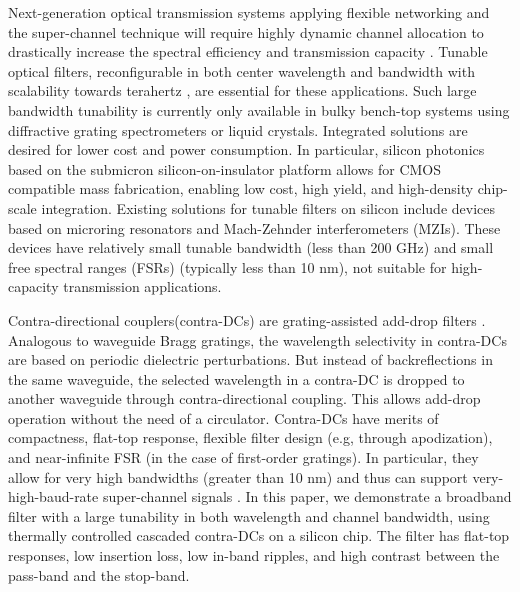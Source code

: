 \documentclass[osajnl,twocolumn,showpacs,superscriptaddress,10pt]{revtex4-1}
\begin{document}
Next-generation optical transmission systems applying flexible networking and the super-channel technique will require highly dynamic channel allocation to drastically increase the spectral efficiency and transmission capacity \cite{jinno2009spectrum, geisler2011demonstration}.
Tunable optical filters, reconfigurable in both center wavelength and bandwidth with scalability towards terahertz \cite{geisler2011demonstration}, are essential for these applications.
Such large bandwidth tunability is currently only available in bulky bench-top systems using diffractive grating spectrometers or liquid crystals.
Integrated solutions are desired for lower cost and power consumption.
In particular, silicon photonics  based on the submicron silicon-on-insulator platform allows for CMOS compatible mass fabrication, enabling low cost, high yield, and high-density chip-scale integration.
Existing solutions for tunable  filters on silicon include devices based on microring resonators \cite{DynamicBW, ong2013ultra} and Mach-Zehnder interferometers (MZIs). These devices have relatively small tunable bandwidth (less than 200 GHz) and small free spectral ranges (FSRs) (typically less than 10 nm), not suitable for high-capacity transmission applications.

Contra-directional couplers(contra-DCs) are grating-assisted add-drop filters \cite{shi2013siliconContraDC}. 
Analogous to waveguide Bragg gratings, the wavelength selectivity in contra-DCs are based on periodic dielectric perturbations. But instead of backreflections in the same waveguide, the selected wavelength in a contra-DC is dropped to another waveguide through contra-directional coupling.
This allows add-drop operation without the need of a circulator. 
Contra-DCs have merits of compactness, flat-top response, flexible filter design (e.g, through apodization), and near-infinite FSR (in the case of first-order gratings).
In particular, they allow for very high bandwidths (greater than 10 nm) and thus can support very-high-baud-rate super-channel signals \cite{jinno2009spectrum}.
In this paper, we demonstrate a broadband filter with a large tunability in both wavelength and channel bandwidth, using thermally controlled cascaded contra-DCs on a silicon chip. 
The filter has flat-top responses, low insertion loss, low in-band ripples, and high contrast between the pass-band and the stop-band.
\end{document}
